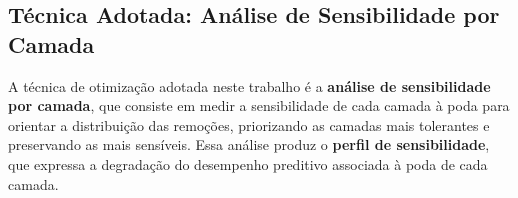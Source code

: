 
\subsection{Técnica Adotada: Análise de Sensibilidade por Camada}

A técnica de otimização adotada neste trabalho é a \textbf{análise de sensibilidade por
camada}, que consiste em medir a sensibilidade de cada camada à poda para orientar a
distribuição das remoções, priorizando as camadas mais tolerantes e preservando as mais
sensíveis. Essa análise produz o \textbf{perfil de sensibilidade}, que expressa a degradação
do desempenho preditivo associada à poda de cada camada.

